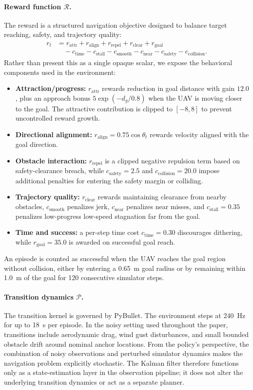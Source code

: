 \documentclass[runningheads]{llncs}
\begin{document}
\paragraph{Reward function $\mathcal{R}$.}
The reward is a structured navigation objective designed to balance target reaching, safety, and trajectory quality:
\begin{align}
  r_t &= r_{\text{attr}} + r_{\text{align}} + r_{\text{repel}} + r_{\text{clear}} + r_{\text{goal}} \nonumber\\
      &\quad - c_{\text{time}} - c_{\text{stall}} - c_{\text{smooth}} - c_{\text{near}} - c_{\text{safety}} - c_{\text{collision}}.
\end{align}
Rather than present this as a single opaque scalar, we expose the behavioral components used in the environment:
\begin{itemize}
\item \textbf{Attraction/progress:} $r_{\text{attr}}$ rewards reduction in goal distance with gain $12.0$, plus an approach bonus $5\exp(-d_g/0.8)$ when the UAV is moving closer to the goal. The attractive contribution is clipped to $[-8,8]$ to prevent uncontrolled reward growth.
\item \textbf{Directional alignment:} $r_{\text{align}} = 0.75 \cos\theta_t$ rewards velocity aligned with the goal direction.
\item \textbf{Obstacle interaction:} $r_{\text{repel}}$ is a clipped negative repulsion term based on safety-clearance breach, while $c_{\text{safety}}=2.5$ and $c_{\text{collision}}=20.0$ impose additional penalties for entering the safety margin or colliding.
\item \textbf{Trajectory quality:} $r_{\text{clear}}$ rewards maintaining clearance from nearby obstacles, $c_{\text{smooth}}$ penalizes jerk, $c_{\text{near}}$ penalizes near misses, and $c_{\text{stall}}=0.35$ penalizes low-progress low-speed stagnation far from the goal.
\item \textbf{Time and success:} a per-step time cost $c_{\text{time}}=0.30$ discourages dithering, while $r_{\text{goal}}=35.0$ is awarded on successful goal reach.
\end{itemize}
An episode is counted as successful when the UAV reaches the goal region without collision, either by entering a \SI{0.65}{m} goal radius or by remaining within \SI{1.0}{m} of the goal for 120 consecutive simulator steps.

\paragraph{Transition dynamics $\mathcal{P}$.}
The transition kernel is governed by PyBullet. The environment steps at \SI{240}{Hz} for up to \SI{18}{s} per episode. In the noisy setting used throughout the paper, transitions include aerodynamic drag, wind gust disturbances, and small bounded obstacle drift around nominal anchor locations. From the policy's perspective, the combination of noisy observations and perturbed simulator dynamics makes the navigation problem explicitly stochastic. The Kalman filter therefore functions only as a state-estimation layer in the observation pipeline; it does not alter the underlying transition dynamics or act as a separate planner.
\end{document}
